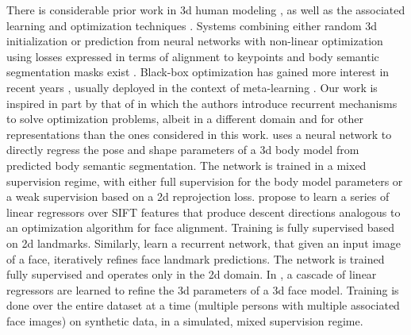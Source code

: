 \documentclass[final]{cvpr}
\begin{document}
 There is considerable prior work in 3d human modeling \cite{SMPL2015,ghum2020,dmhs_cvpr17,zanfir2018monocular,Rhodin_2018_ECCV,Kanazawa2018,kolotouros2019learning,ExPose:2020}, as well as the associated learning and optimization techniques \cite{sminchisescu_ijrr03,bogo2016}.
Systems combining either random 3d initialization or prediction from neural networks with non-linear optimization using losses expressed in terms of alignment to keypoints and body semantic segmentation masks exist \cite{bogo2016,zanfir2018monocular,kolotouros2019learning}. Black-box optimization has gained more interest in recent years \cite{andrychowicz2016learning, chen2017learning}, usually deployed in the context of meta-learning \cite{hospedales2020metalearning}. Our work is inspired in part by that of \cite{chen2017learning,hospedales2020metalearning} in which the authors introduce recurrent mechanisms to solve optimization problems, albeit in a different domain and for other representations than the ones considered in this work.
\cite{omran2018nbf} uses a neural network to directly regress the pose and shape parameters of a 3d body model from predicted body semantic segmentation. The network is trained in a mixed supervision regime, with either full supervision for the body model parameters or a weak supervision based on a 2d reprojection loss.
\cite{xiong2013supervised} propose to learn a series of linear regressors over SIFT \cite{lowe2004distinctive} features that produce descent directions analogous to an optimization algorithm for face alignment. Training is fully supervised based on 2d landmarks.
Similarly, \cite{trigeorgis2016mnemonic} learn a recurrent network, that given an input image of a face, iteratively refines face landmark predictions. The network is trained fully supervised and operates only in the 2d domain.
In \cite{tian2019regressing}, a cascade of linear regressors are learned to refine the 3d parameters of a 3d face model. Training is done over the entire dataset at a time (multiple persons with multiple associated face images) on synthetic data, in a simulated, mixed supervision regime.
\end{document}
